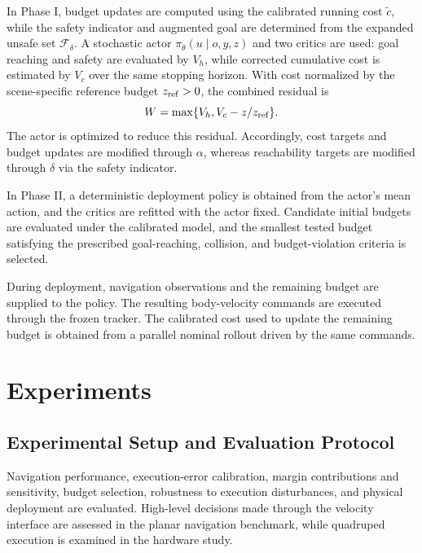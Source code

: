 \documentclass[conference]{IEEEtran}
\begin{document}
In Phase I, budget updates are computed using the calibrated running cost $\tilde c$,
while the safety indicator and augmented goal are determined from the expanded
unsafe set $\mathcal{F}_\delta$. A stochastic actor
$\pi_\theta(u\mid o,y,z)$ and two critics are used: goal reaching and safety
are evaluated by $V_h$, while corrected cumulative cost is estimated by $V_c$
over the same stopping horizon. With cost normalized by the scene-specific
reference budget $z_{\rm ref}>0$, the combined residual is
\begin{equation}
W=\max\{V_h,V_c-z/z_{\rm ref}\}.
\label{eq:combined_residual}
\end{equation}
The actor is optimized to reduce this residual. Accordingly, cost targets and
budget updates are modified through $\alpha$, whereas reachability targets are
modified through $\delta$ via the safety indicator.

In Phase II, a deterministic deployment policy is obtained from the actor's mean
action, and the critics are refitted with the actor fixed. Candidate initial
budgets are evaluated under the calibrated model, and the smallest tested budget
satisfying the prescribed goal-reaching, collision, and budget-violation criteria
is selected.

During deployment, navigation observations and the remaining budget are supplied
to the policy. The resulting body-velocity commands are executed through the
frozen tracker. The calibrated cost used to update the remaining budget is
obtained from a parallel nominal rollout driven by the same commands.

\section{Experiments}
\subsection{Experimental Setup and Evaluation Protocol}
\label{sec:experimental_setup}
Navigation performance, execution-error calibration, margin contributions and
sensitivity, budget selection, robustness to execution disturbances, and physical
deployment are evaluated. High-level decisions made through the velocity interface are
assessed in the planar navigation benchmark, while quadruped execution is examined
in the hardware study.
\end{document}
